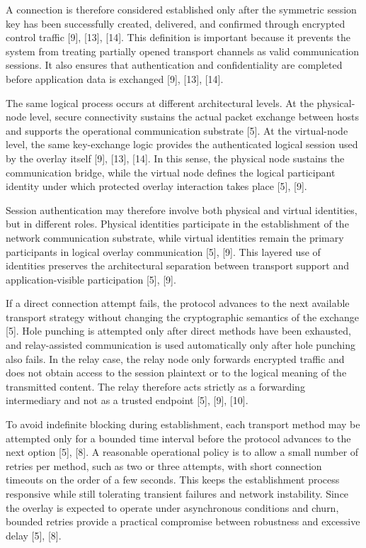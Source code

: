 \documentclass[12pt,a4paper]{article}
\begin{document}
A connection is therefore considered established only after the symmetric session key has been successfully created, delivered, and confirmed through encrypted control traffic [9], [13], [14]. This definition is important because it prevents the system from treating partially opened transport channels as valid communication sessions. It also ensures that authentication and confidentiality are completed before application data is exchanged [9], [13], [14].

The same logical process occurs at different architectural levels. At the physical-node level, secure connectivity sustains the actual packet exchange between hosts and supports the operational communication substrate [5]. At the virtual-node level, the same key-exchange logic provides the authenticated logical session used by the overlay itself [9], [13], [14]. In this sense, the physical node sustains the communication bridge, while the virtual node defines the logical participant identity under which protected overlay interaction takes place [5], [9].

Session authentication may therefore involve both physical and virtual identities, but in different roles. Physical identities participate in the establishment of the network communication substrate, while virtual identities remain the primary participants in logical overlay communication [5], [9]. This layered use of identities preserves the architectural separation between transport support and application-visible participation [5], [9].

If a direct connection attempt fails, the protocol advances to the next available transport strategy without changing the cryptographic semantics of the exchange [5]. Hole punching is attempted only after direct methods have been exhausted, and relay-assisted communication is used automatically only after hole punching also fails. In the relay case, the relay node only forwards encrypted traffic and does not obtain access to the session plaintext or to the logical meaning of the transmitted content. The relay therefore acts strictly as a forwarding intermediary and not as a trusted endpoint [5], [9], [10].

To avoid indefinite blocking during establishment, each transport method may be attempted only for a bounded time interval before the protocol advances to the next option [5], [8]. A reasonable operational policy is to allow a small number of retries per method, such as two or three attempts, with short connection timeouts on the order of a few seconds. This keeps the establishment process responsive while still tolerating transient failures and network instability. Since the overlay is expected to operate under asynchronous conditions and churn, bounded retries provide a practical compromise between robustness and excessive delay [5], [8].
\end{document}

